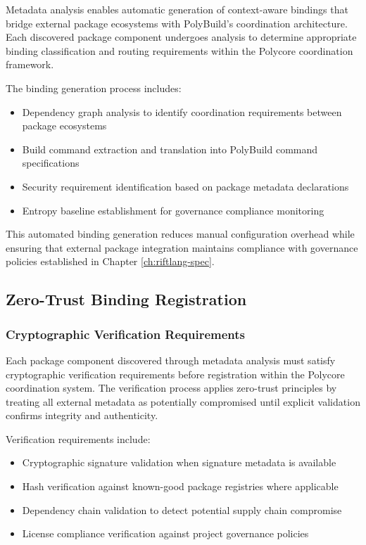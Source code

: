 Metadata analysis enables automatic generation of context-aware bindings that bridge external package ecosystems with PolyBuild's coordination architecture. Each discovered package component undergoes analysis to determine appropriate binding classification and routing requirements within the Polycore coordination framework.

The binding generation process includes:
\begin{itemize}
\item Dependency graph analysis to identify coordination requirements between package ecosystems
\item Build command extraction and translation into PolyBuild command specifications
\item Security requirement identification based on package metadata declarations
\item Entropy baseline establishment for governance compliance monitoring
\end{itemize}

This automated binding generation reduces manual configuration overhead while ensuring that external package integration maintains compliance with governance policies established in Chapter \ref{ch:riftlang-spec}.

\subsection{Zero-Trust Binding Registration}

\subsubsection{Cryptographic Verification Requirements}

Each package component discovered through metadata analysis must satisfy cryptographic verification requirements before registration within the Polycore coordination system. The verification process applies zero-trust principles by treating all external metadata as potentially compromised until explicit validation confirms integrity and authenticity.

Verification requirements include:
\begin{itemize}
\item Cryptographic signature validation when signature metadata is available
\item Hash verification against known-good package registries where applicable
\item Dependency chain validation to detect potential supply chain compromise
\item License compliance verification against project governance policies
\end{itemize}

